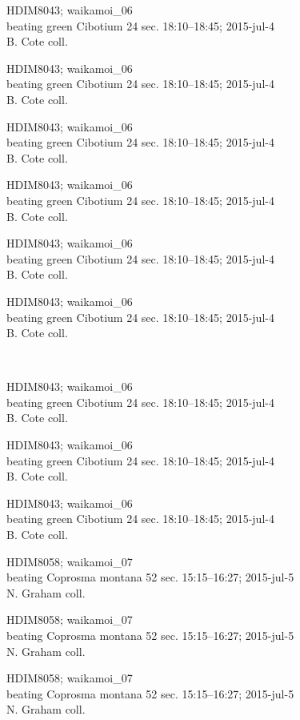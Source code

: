 \documentclass[2pt]{extarticle}
\begin{document}
\noindent
\parbox{0.16\textwidth}{\tiny \raggedright \rule[-0.3\baselineskip]{0pt}{10pt}HDIM8043; waikamoi\_06\\ beating green Cibotium 24 sec. 18:10--18:45; 2015-jul-4\\ B. Cote coll.}
\parbox{0.16\textwidth}{\tiny \raggedright \rule[-0.3\baselineskip]{0pt}{10pt}HDIM8043; waikamoi\_06\\ beating green Cibotium 24 sec. 18:10--18:45; 2015-jul-4\\ B. Cote coll.}
\parbox{0.16\textwidth}{\tiny \raggedright \rule[-0.3\baselineskip]{0pt}{10pt}HDIM8043; waikamoi\_06\\ beating green Cibotium 24 sec. 18:10--18:45; 2015-jul-4\\ B. Cote coll.}
\parbox{0.16\textwidth}{\tiny \raggedright \rule[-0.3\baselineskip]{0pt}{10pt}HDIM8043; waikamoi\_06\\ beating green Cibotium 24 sec. 18:10--18:45; 2015-jul-4\\ B. Cote coll.}
\parbox{0.16\textwidth}{\tiny \raggedright \rule[-0.3\baselineskip]{0pt}{10pt}HDIM8043; waikamoi\_06\\ beating green Cibotium 24 sec. 18:10--18:45; 2015-jul-4\\ B. Cote coll.}
\parbox{0.16\textwidth}{\tiny \raggedright \rule[-0.3\baselineskip]{0pt}{10pt}HDIM8043; waikamoi\_06\\ beating green Cibotium 24 sec. 18:10--18:45; 2015-jul-4\\ B. Cote coll.} \\ 
\vspace{0.001in} 

\noindent
\parbox{0.16\textwidth}{\tiny \raggedright \rule[-0.3\baselineskip]{0pt}{10pt}HDIM8043; waikamoi\_06\\ beating green Cibotium 24 sec. 18:10--18:45; 2015-jul-4\\ B. Cote coll.}
\parbox{0.16\textwidth}{\tiny \raggedright \rule[-0.3\baselineskip]{0pt}{10pt}HDIM8043; waikamoi\_06\\ beating green Cibotium 24 sec. 18:10--18:45; 2015-jul-4\\ B. Cote coll.}
\parbox{0.16\textwidth}{\tiny \raggedright \rule[-0.3\baselineskip]{0pt}{10pt}HDIM8043; waikamoi\_06\\ beating green Cibotium 24 sec. 18:10--18:45; 2015-jul-4\\ B. Cote coll.}
\parbox{0.16\textwidth}{\tiny \raggedright \rule[-0.3\baselineskip]{0pt}{10pt}HDIM8058; waikamoi\_07\\ beating Coprosma montana 52 sec. 15:15--16:27; 2015-jul-5\\ N. Graham coll.}
\parbox{0.16\textwidth}{\tiny \raggedright \rule[-0.3\baselineskip]{0pt}{10pt}HDIM8058; waikamoi\_07\\ beating Coprosma montana 52 sec. 15:15--16:27; 2015-jul-5\\ N. Graham coll.}
\parbox{0.16\textwidth}{\tiny \raggedright \rule[-0.3\baselineskip]{0pt}{10pt}HDIM8058; waikamoi\_07\\ beating Coprosma montana 52 sec. 15:15--16:27; 2015-jul-5\\ N. Graham coll.} \\ 
\vspace{0.001in} 
\end{document}
